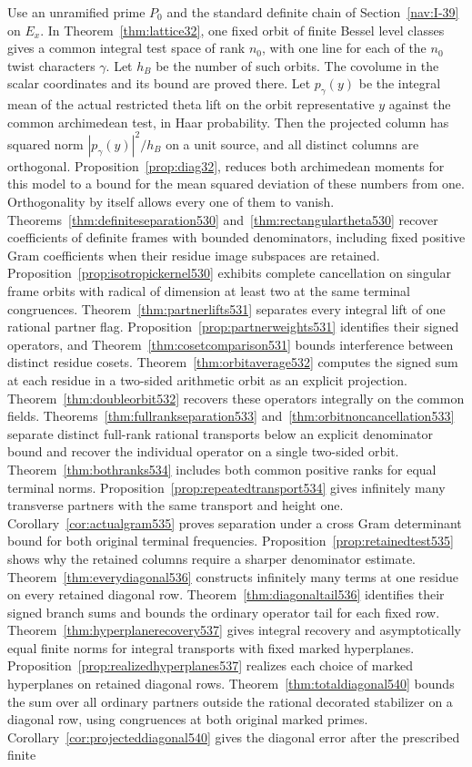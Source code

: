 \documentclass[a4paper,11pt]{article}
\theoremstyle{definition}
\theoremstyle{remark}
\newcommand{\lead}[1]{\par\smallskip\noindent{\bfseries\color{ink}#1.}\enspace}
\numberwithin{equation}{section}
\begin{document}
\lead{The individual global periods}Use an unramified prime \(P_0\) and the standard definite chain of Section~\ref{nav:I-39} on \(E_x\). In Theorem~\ref{thm:lattice32}, one fixed orbit of finite Bessel level classes gives a common integral test space of rank \(n_0\), with one line for each of the \(n_0\) twist characters \(\gamma\). Let \(h_B\) be the number of such orbits. The covolume in the scalar coordinates and its bound are proved there. Let \(p_\gamma(y)\) be the integral mean of the actual restricted theta lift on the orbit representative \(y\) against the common archimedean test, in Haar probability. Then the projected column has squared norm \(|p_\gamma(y)|^2/h_B\) on a unit source, and all distinct columns are orthogonal. Proposition~\ref{prop:diag32}, reduces both archimedean moments for this model to a bound for the mean squared deviation of these numbers from one. Orthogonality by itself allows every one of them to vanish. Theorems~\ref{thm:definiteseparation530} and~\ref{thm:rectangulartheta530} recover coefficients of definite frames with bounded denominators, including fixed positive Gram coefficients when their residue image subspaces are retained. Proposition~\ref{prop:isotropickernel530} exhibits complete cancellation on singular frame orbits with radical of dimension at least two at the same terminal congruences. Theorem~\ref{thm:partnerlifts531} separates every integral lift of one rational partner flag. Proposition~\ref{prop:partnerweights531} identifies their signed operators, and Theorem~\ref{thm:cosetcomparison531} bounds interference between distinct residue cosets. Theorem~\ref{thm:orbitaverage532} computes the signed sum at each residue in a two-sided arithmetic orbit as an explicit projection. Theorem~\ref{thm:doubleorbit532} recovers these operators integrally on the common fields. Theorems~\ref{thm:fullrankseparation533} and~\ref{thm:orbitnoncancellation533} separate distinct full-rank rational transports below an explicit denominator bound and recover the individual operator on a single two-sided orbit. Theorem~\ref{thm:bothranks534} includes both common positive ranks for equal terminal norms. Proposition~\ref{prop:repeatedtransport534} gives infinitely many transverse partners with the same transport and height one. Corollary~\ref{cor:actualgram535} proves separation under a cross Gram determinant bound for both original terminal frequencies. Proposition~\ref{prop:retainedtest535} shows why the retained columns require a sharper denominator estimate. Theorem~\ref{thm:everydiagonal536} constructs infinitely many terms at one residue on every retained diagonal row. Theorem~\ref{thm:diagonaltail536} identifies their signed branch sums and bounds the ordinary operator tail for each fixed row. Theorem~\ref{thm:hyperplanerecovery537} gives integral recovery and asymptotically equal finite norms for integral transports with fixed marked hyperplanes. Proposition~\ref{prop:realizedhyperplanes537} realizes each choice of marked hyperplanes on retained diagonal rows. Theorem~\ref{thm:totaldiagonal540} bounds the sum over all ordinary partners outside the rational decorated stabilizer on a diagonal row, using congruences at both original marked primes. Corollary~\ref{cor:projecteddiagonal540} gives the diagonal error after the prescribed finite 
\end{document}
